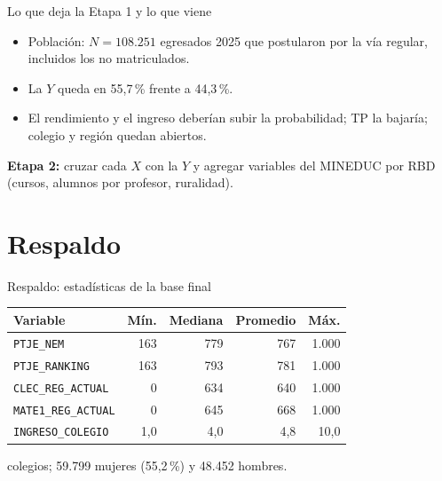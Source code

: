 \begin{frame}{Lo que deja la Etapa 1 y lo que viene}
  \begin{itemize}[itemsep=7pt]
    \item Población: $N = 108.251$ egresados 2025 que postularon por la vía
          regular, incluidos los no matriculados.
    \item La $Y$ queda en 55,7\,\% frente a 44,3\,\%.
    \item El rendimiento y el ingreso deberían subir la probabilidad; TP la
          bajaría; colegio y región quedan abiertos.
  \end{itemize}
  \vfill
  \begin{tcolorbox}[nota]
  \textbf{Etapa 2:} cruzar cada $X$ con la $Y$ y agregar variables del
  MINEDUC por RBD (cursos, alumnos por profesor, ruralidad).
  \end{tcolorbox}
\end{frame}

\appendix
\section*{Respaldo}

\begin{frame}{Respaldo: estadísticas de la base final}
  \begin{center}
  \begin{tabular}{lrrrr}
    \toprule
    \textbf{Variable} & \textbf{Mín.} & \textbf{Mediana} & \textbf{Promedio} & \textbf{Máx.} \\
    \midrule
    \texttt{PTJE\_NEM}          & 163 & 779 & 767 & 1.000 \\
    \texttt{PTJE\_RANKING}      & 163 & 793 & 781 & 1.000 \\
    \texttt{CLEC\_REG\_ACTUAL}  & 0   & 634 & 640 & 1.000 \\
    \texttt{MATE1\_REG\_ACTUAL} & 0   & 645 & 668 & 1.000 \\
    \texttt{INGRESO\_COLEGIO}   & 1,0 & 4,0 & 4,8 & 10,0 \\
    \bottomrule
  \end{tabular}
  \end{center}
   colegios; 59.799 mujeres (55,2\,\%) y 48.452 hombres.
\end{frame}

